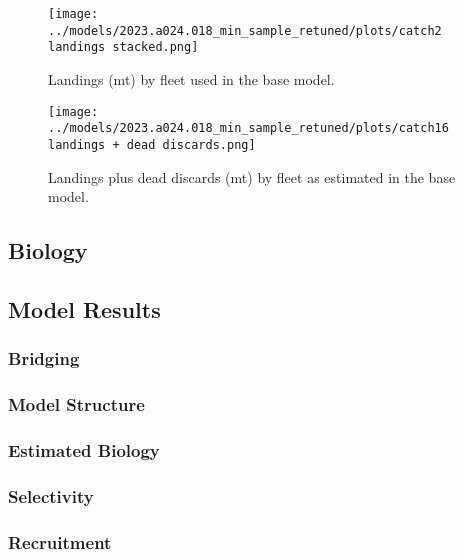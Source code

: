 \documentclass[11pt,
  english,
  letterpaper,
]{article}
\begin{document}
\begin{figure}
\centering
\texttt{[image: ../models/2023.a024.018\_min\_sample\_retuned/plots/catch2 landings stacked.png]}
\caption{Landings (mt) by fleet used in the base model.\label{fig:catch-figures-r4ss}}
\end{figure}

\begin{figure}
\centering
\texttt{[image: ../models/2023.a024.018\_min\_sample\_retuned/plots/catch16 landings + dead discards.png]}
\caption{Landings plus dead discards (mt) by fleet as estimated in the base model.\label{fig:catchdiscard-figures-r4ss}}
\end{figure}

\hypertarget{biology}{%
\subsection{Biology}\label{biology}}

\hypertarget{model-results}{%
\subsection{Model Results}\label{model-results}}

\hypertarget{bridging}{%
\subsubsection{Bridging}\label{bridging}}

\hypertarget{model-structure}{%
\subsubsection{Model Structure}\label{model-structure}}

\hypertarget{estimated-biology}{%
\subsubsection{Estimated Biology}\label{estimated-biology}}

\hypertarget{selectivity}{%
\subsubsection{Selectivity}\label{selectivity}}

\hypertarget{recruitment-1}{%
\subsubsection{Recruitment}\label{recruitment-1}}
\end{document}
